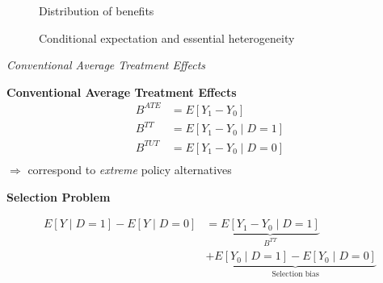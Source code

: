 \begin{frame}
\begin{figure}[htp]\centering\caption{Distribution of benefits}
\end{figure}
\end{frame}
\begin{frame}
	\begin{figure}\caption{Conditional expectation and essential heterogeneity}
	\end{figure}
\end{frame}
\begin{frame}\begin{center}
		\LARGE\textit{Conventional Average Treatment Effects}
\end{center}\end{frame}
\begin{frame}
	\textbf{Conventional Average Treatment Effects}
	\begin{align*}
		B^{ATE} & = E[Y_1 - Y_0 ]\\
		B^{TT} & = E[Y_1 - Y_0 \mid D = 1]\\
		B^{TUT} & = E[Y_1 - Y_0 \mid D = 0]\\
	\end{align*}
	\(\Rightarrow\) correspond to \emph{extreme} policy alternatives
\end{frame}
\begin{frame}
\textbf{Selection Problem}

	\begin{align*}
		E[Y\mid D = 1] - E[Y\mid D = 0] & = \underbrace{E[Y_1 - Y_0\mid D = 1]}_{B^{TT}} \\
		& + \underbrace{E[Y_0\mid D= 1]- E[Y_0 \mid D = 0]}_{\text{Selection bias}}
	\end{align*}
\end{frame}
